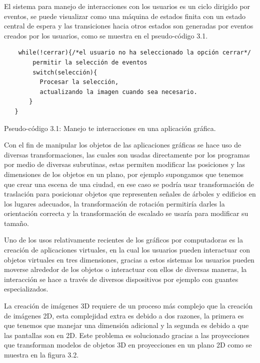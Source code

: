 \documentclass[12pt,a4paper,spanish,openany]{book}
\begin{document}
El sistema para manejo de interacciones con los usuarios es un ciclo dirigido
por eventos, se puede visualizar como una máquina de estados finita con un
estado central de espera y las transiciones hacia otros estados son generadas
por eventos creados por los usuarios, como se muestra en el pseudo-código 3.1.


\begin{verbatim}
    while(!cerrar){/*el usuario no ha seleccionado la opción cerrar*/
        permitir la selección de eventos
        switch(selección){
          Procesar la selección, 
          actualizando la imagen cuando sea necesario.
       } 
   }
\end{verbatim}
\begin{center}
Pseudo-código 3.1: Manejo te interacciones en una aplicación gráfica.
\end{center}


Con el fin de manipular los objetos de las aplicaciones gráficas se hace uso de
diversas transformaciones, las cuales son usadas directamente por los programas
por medio de diversas subrutinas, estas permiten modificar las posiciones y las
dimensiones de los objetos en un plano, por ejemplo supongamos que tenemos que
crear una escena de una ciudad, en ese caso se podría usar transformación de
traslación para posicionar objetos que representen señales de árboles y
edificios en los lugares adecuados, la transformación de rotación permitiría
darles la orientación correcta y la transformación de escalado se
usaría para modificar su tamaño.

Uno de los usos relativamente recientes de los gráficos por computadoras
es la creación de aplicaciones virtuales, en la cual los usuarios pueden
interactuar con objetos virtuales en tres dimensiones, gracias a estos sistemas
los usuarios pueden moverse alrededor de los objetos o interactuar con ellos de
diversas maneras, la interacción se hace a través de diversos dispositivos por
ejemplo con guantes especializados.

La creación de imágenes 3D requiere de un proceso más complejo que la creación
de imágenes 2D, esta complejidad extra es debido a dos razones, la primera es
que tenemos que manejar una dimensión adicional y la segunda es debido a que las
pantallas son en 2D. Este problema es solucionado gracias a las proyecciones
que transforman modelos de objetos 3D en proyecciones en un plano 2D como se
muestra en la figura 3.2.
\end{document}
